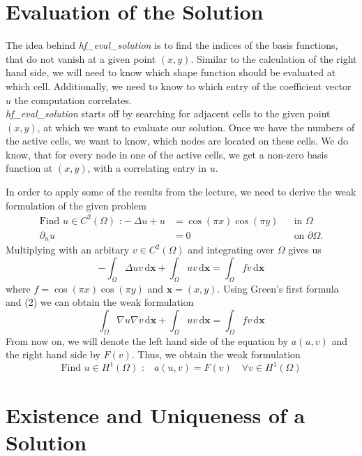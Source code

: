 \documentclass[a4paper,12pt]{article}
\begin{document}
\section{Evaluation of the Solution}
The idea behind \textit{hf\_eval\_solution} is to find the indices of the basis functions, that do not vanish at a given point $(x,y)$. Similar to the calculation of the right hand side, we will need to know which shape function should be evaluated at which cell. Additionally, we need to know to which entry of the coefficient vector $u$ the computation correlates.\\
\textit{hf\_eval\_solution} starts off by searching for adjacent cells to the given point $(x,y)$, at which we want to evaluate our solution. Once we have the numbers of the active cells, we want to know, which nodes are located on these cells. We do know, that for every node in one of the active cells, we get a non-zero basis function at $(x,y)$, with a correlating entry in $u$.  



In order to apply some of the results from the lecture, we need to derive the weak formulation of the given problem 
\begin{align}
\mbox{Find } u\in C^2(\Omega)\mbox{ :}-\Delta u+u &= \cos(\pi x)\cos(\pi y) &&\mbox{in } \Omega \\
\partial _n u &= 0 &&\mbox{on } \partial\Omega.
\end{align}
Multiplying with an arbitary $v\in C^2(\Omega)$ and integrating over $\Omega$ gives us
\[-\int _\Omega \Delta uv \,\mbox{d} \bm{x} + \int _\Omega uv \,\mbox{d} \bm{x} = \int _ \Omega fv\,\mbox{d} \bm{x}\]
where $f=\cos(\pi x)\cos(\pi y)$ and $\bm{x}=(x,y)$. Using Green's first formula and (2) we can obtain the weak formulation
\[\int _\Omega \nabla u\nabla v \,\mbox{d} \bm{x} + \int _\Omega uv \,\mbox{d} \bm{x} = \int _ \Omega fv\,\mbox{d} \bm{x}\]
From now on, we will denote the left hand side of the equation by $a(u,v)$ and the right hand side by $F(v)$. Thus, we obtain the weak formulation
\begin{equation}
\mbox{Find }u\in H^1(\Omega) \mbox{ :} \quad a(u,v)=F(v)\quad \forall v \in H^1(\Omega)
\end{equation}

\section{Existence and Uniqueness of a Solution}
\end{document}
